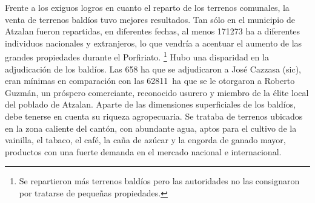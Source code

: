 \documentclass[14pt,twoside,final]{extbook} %
\let\oldfootnote\footnote
\renewcommand\footnote[1]{%
\oldfootnote{\hspace{1mm}#1}}
\begin{document}
Frente a los exiguos logros en cuanto el reparto de los terrenos comunales, la venta de terrenos baldíos tuvo mejores resultados. Tan sólo en el municipio de Atzalan fueron repartidas, en diferentes fechas, al menos 171273 ha a diferentes individuos nacionales y extranjeros, lo que vendría a acentuar el aumento de las grandes propiedades durante el Porfiriato.\footnote{Se repartieron más terrenos baldíos pero las autoridades no las consignaron por tratarse de pequeñas propiedades.} Hubo una disparidad en la adjudicación de los baldíos. Las 658 ha que se adjudicaron a José Cazzasa (sic), eran mínimas en comparación con las 62811~ha que se le otorgaron a Roberto Guzmán, un próspero comerciante, reconocido usurero y miembro de la élite local del poblado de Atzalan. Aparte de las dimensiones superficiales de los baldíos, debe tenerse en cuenta su riqueza agropecuaria. Se trataba de terrenos ubicados en la zona caliente del cantón, con abundante agua, aptos para el cultivo de la vainilla, el tabaco, el café, la caña de azúcar y la engorda de ganado mayor, productos con una fuerte demanda en el mercado nacional e internacional.
\end{document}
